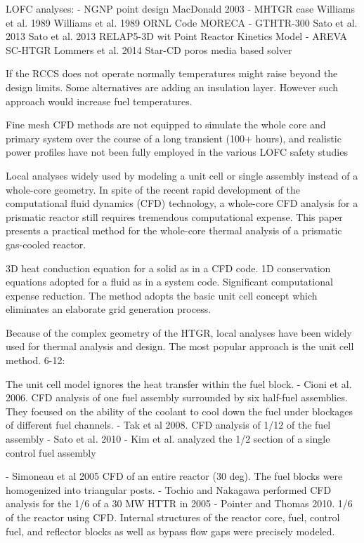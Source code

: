 LOFC analyses:
- NGNP point design MacDonald 2003
- MHTGR case Williams et al. 1989
Williams et al. 1989
ORNL Code MORECA
- GTHTR-300 Sato et al. 2013
Sato et al. 2013
RELAP5-3D wit Point Reactor Kinetics Model
- AREVA SC-HTGR Lommers et al. 2014
Star-CD poros media based solver

If the RCCS does not operate normally temperatures might raise beyond the design limits.
Some alternatives are adding an insulation layer.
However such approach would increase fuel temperatures.

Fine mesh CFD methods are not equipped to simulate the whole core and primary system over the course of a long transient (100+ hours), and  realistic power profiles have not been fully employed in the various LOFC safety studies

Local analyses widely used by modeling a unit cell or single assembly instead of a whole-core geometry.
In spite of the recent rapid development of the computational fluid dynamics (CFD) technology, a whole-core CFD analysis for a prismatic reactor still requires tremendous computational expense.
This paper presents a practical method for the whole-core thermal analysis of a prismatic gas-cooled reactor.

3D heat conduction equation for a solid as in a CFD code.
1D conservation equations adopted for a fluid as in a system code.
Significant computational expense reduction.
The method adopts the basic unit cell concept which eliminates an elaborate grid generation process.

Because of the complex geometry of the HTGR, local analyses have been widely used for thermal analysis and design.
The most popular approach is the unit cell method.
6-12:

The unit cell model ignores the heat transfer within the fuel block.
- Cioni et al. 2006. CFD analysis of one fuel assembly surrounded by six half-fuel assemblies.
They focused on the ability of the coolant to cool down the fuel under blockages of different fuel channels.
- Tak et al 2008. CFD analysis of 1/12 of the fuel assembly
- Sato et al. 2010
- Kim et al. analyzed the 1/2 section of a single control fuel assembly

- Simoneau et al 2005 CFD of an entire reactor (30 deg). The fuel blocks were homogenized into triangular posts.
- Tochio and Nakagawa performed CFD analysis for the 1/6 of a 30 MW HTTR in 2005
- Pointer and Thomas 2010. 1/6 of the reactor using CFD. Internal structures of the reactor core, fuel, control fuel, and reflector blocks as well as bypass flow gaps were precisely modeled.

